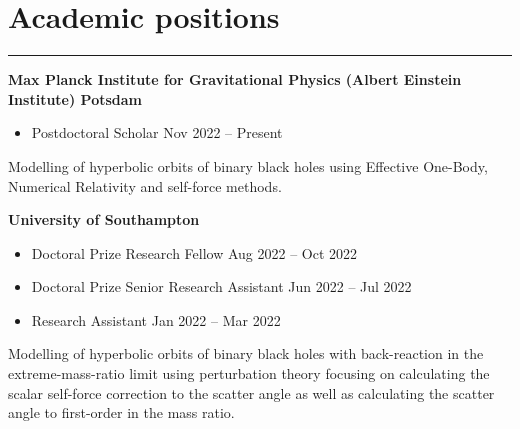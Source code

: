 \documentclass[10.5pt, oneside]{article}   	%
\begin{document}
 
 
\begin{center}
\huge
\href{mailto:oliver.long@aei.mpg.de}{} \:
\textcolor{Orcidcolour}{\href{https://orcid.org/0000-0002-3897-9272}{}} \:
\textcolor{RGcolour}{\href{https://www.researchgate.net/profile/Oliver-Long-3}{}} \:
\textcolor{LIcolour}{\href{https://www.linkedin.com/in/oliverflong/}{}} \:
\href{https://scholar.google.com/citations?user=92pSUO0AAAAJ&hl=en}{} \:
\href{https://oliverlong.info}{}
\end{center}

 \vspace{1mm}


{\color{Sectioncolour}
\section*{Academic positions}
\vspace{-3mm}
\noindent\rule{\linewidth}{0.6pt}}

\textbf{Max Planck Institute for Gravitational Physics (Albert Einstein Institute) Potsdam} \\
\vspace{-5mm}
\begin{itemize}
\item Postdoctoral Scholar \hfill Nov 2022 -- Present
\end{itemize}
Modelling of hyperbolic orbits of binary black holes using Effective One-Body, Numerical Relativity and self-force methods.

\textbf{University of Southampton} \\
\vspace{-5mm}
\begin{itemize}
\item Doctoral Prize Research Fellow \hfill Aug 2022 -- Oct 2022
\item Doctoral Prize Senior Research Assistant \hfill Jun 2022 -- Jul 2022
\item Research Assistant \hfill Jan 2022 -- Mar 2022
\end{itemize}
Modelling of hyperbolic orbits of binary black holes with back-reaction in the extreme-mass-ratio limit using perturbation theory focusing on calculating the scalar self-force correction to the scatter angle as well as calculating the scatter angle to first-order in the mass ratio.
\end{document}
